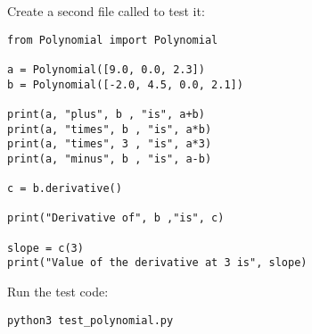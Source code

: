 Create a second file called  to test it:
\begin{Verbatim}[commandchars=\\\{\}]
from Polynomial import Polynomial

a = Polynomial([9.0, 0.0, 2.3])
b = Polynomial([-2.0, 4.5, 0.0, 2.1])

print(a, "plus", b , "is", a+b)
print(a, "times", b , "is", a*b)
print(a, "times", 3 , "is", a*3)
print(a, "minus", b , "is", a-b)

c = b.derivative()

print("Derivative of", b ,"is", c)

slope = c(3)
print("Value of the derivative at 3 is", slope)

\end{Verbatim}

Run the test code:
\begin{Verbatim}
python3 test_polynomial.py
\end{Verbatim}
